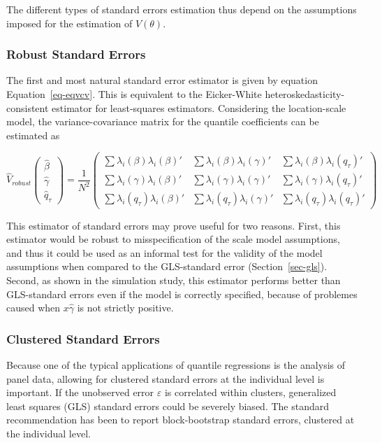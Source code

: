 \documentclass[
  authoryear,
  review,
  1p]{elsarticle}
\begin{document}
The different types of standard errors estimation thus depend on the
assumptions imposed for the estimation of \(V(\theta)\).

\subsubsection{Robust Standard Errors}\label{robust-standard-errors}

The first and most natural standard error estimator is given by equation
Equation~\ref{eq-eqvcv}. This is equivalent to the Eicker-White
heteroskedasticity-consistent estimator for least-squares estimators.
Considering the location-scale model, the variance-covariance matrix for
the quantile coefficients can be estimated as

\[\hat{V}_{robust}
  \begin{pmatrix}
  \hat\beta \\
  \hat\gamma \\
  \hat q_\tau
  \end{pmatrix}
 = \frac{1}{N^2} 
 \begin{pmatrix}
 \sum \lambda_i(\beta) \lambda_i(\beta)' & \sum \lambda_i(\beta) \lambda_i(\gamma)' & \sum \lambda_i(\beta) \lambda_i(q_\tau)' \\
 \sum \lambda_i(\gamma) \lambda_i(\beta)' & \sum \lambda_i(\gamma) \lambda_i(\gamma)' & \sum \lambda_i(\gamma) \lambda_i(q_\tau)' \\
 \sum \lambda_i(q_\tau) \lambda_i(\beta)' & \sum \lambda_i(q_\tau)\lambda_i(\gamma)' & \sum \lambda_i(q_\tau) \lambda_i(q_\tau)' 
  \end{pmatrix}
\]

This estimator of standard errors may prove useful for two reasons.
First, this estimator would be robust to misspecification of the scale
model assumptions, and thus it could be used as an informal test for the
validity of the model assumptions when compared to the GLS-standard
error (Section~\ref{sec-gls}). Second, as shown in the simulation study,
this estimator performs better than GLS-standard errors even if the
model is correctly specified, because of problemes caused when
\(x\hat\gamma\) is not strictly positive.

\subsubsection{Clustered Standard
Errors}\label{clustered-standard-errors}

Because one of the typical applications of quantile regressions is the
analysis of panel data, allowing for clustered standard errors at the
individual level is important. If the unobserved error \(\varepsilon\)
is correlated within clusters, generalized least squares (GLS) standard
errors could be severely biased. The standard recommendation has been to
report block-bootstrap standard errors, clustered at the individual
level.
\end{document}
